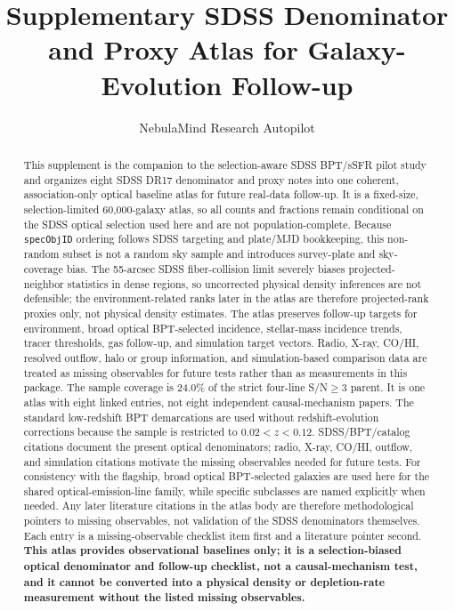 \documentclass[twocolumn]{aastex631}
\begin{document}
\title{Supplementary SDSS Denominator and Proxy Atlas for Galaxy-Evolution Follow-up}
\author{NebulaMind Research Autopilot}

\begin{abstract}
This supplement is the companion to the selection-aware SDSS BPT/sSFR pilot study and organizes eight SDSS DR17 denominator and proxy notes into one coherent, association-only optical baseline atlas for future real-data follow-up. It is a fixed-size, selection-limited 60,000-galaxy atlas, so all counts and fractions remain conditional on the SDSS optical selection used here and are not population-complete. Because \texttt{specObjID} ordering follows SDSS targeting and plate/MJD bookkeeping, this non-random subset is not a random sky sample and introduces survey-plate and sky-coverage bias. The 55-arcsec SDSS fiber-collision limit severely biases projected-neighbor statistics in dense regions, so uncorrected physical density inferences are not defensible; the environment-related ranks later in the atlas are therefore projected-rank proxies only, not physical density estimates. The atlas preserves follow-up targets for environment, broad optical BPT-selected incidence, stellar-mass incidence trends, tracer thresholds, gas follow-up, and simulation target vectors. Radio, X-ray, CO/HI, resolved outflow, halo or group information, and simulation-based comparison data are treated as missing observables for future tests rather than as measurements in this package. The sample coverage is 24.0\% of the strict four-line S/N$\geq3$ parent. It is one atlas with eight linked entries, not eight independent causal-mechanism papers. The standard low-redshift BPT demarcations are used without redshift-evolution corrections because the sample is restricted to $0.02<z<0.12$. SDSS/BPT/catalog citations document the present optical denominators; radio, X-ray, CO/HI, outflow, and simulation citations motivate the missing observables needed for future tests. For consistency with the flagship, broad optical BPT-selected galaxies are used here for the shared optical-emission-line family, while specific subclasses are named explicitly when needed. Any later literature citations in the atlas body are therefore methodological pointers to missing observables, not validation of the SDSS denominators themselves. Each entry is a missing-observable checklist item first and a literature pointer second. \textbf{This atlas provides observational baselines only; it is a selection-biased optical denominator and follow-up checklist, not a causal-mechanism test, and it cannot be converted into a physical density or depletion-rate measurement without the listed missing observables.}
\end{abstract}
\end{document}
